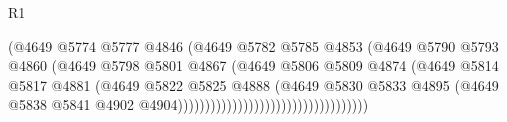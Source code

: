\begin{lexlean}{R1}
\begin{coremodule}
                                                        (@4649
                                                          @5774
                                                          @5777
                                                          @4846
                                                          (@4649
                                                            @5782
                                                            @5785
                                                            @4853
                                                            (@4649
                                                              @5790
                                                              @5793
                                                              @4860
                                                              (@4649
                                                                @5798
                                                                @5801
                                                                @4867
                                                                (@4649
                                                                  @5806
                                                                  @5809
                                                                  @4874
                                                                  (@4649
                                                                    @5814
                                                                    @5817
                                                                    @4881
                                                                    (@4649
                                                                      @5822
                                                                      @5825
                                                                      @4888
                                                                      (@4649
                                                                        @5830
                                                                        @5833
                                                                        @4895
                                                                        (@4649
                                                                          @5838
                                                                          @5841
                                                                          @4902
                                                                          @4904)))))))))))))))))))))))))))))))))))

\end{coremodule}
\end{lexlean}
